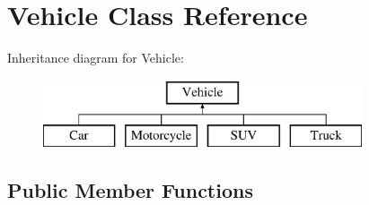 \hypertarget{class_vehicle}{}\section{Vehicle Class Reference}
\label{class_vehicle}
Inheritance diagram for Vehicle\+:\begin{figure}[H]
\begin{center}
\leavevmode
\includegraphics[height=2.000000cm]{class_vehicle}
\end{center}
\end{figure}
\subsection*{Public Member Functions}
